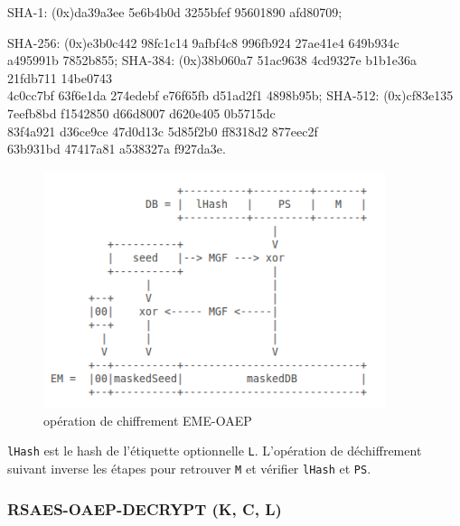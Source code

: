 \begin{description}
   	\item SHA-1:   (0x)da39a3ee 5e6b4b0d 3255bfef 95601890 afd80709;
   	\item SHA-256: (0x)e3b0c442 98fc1c14 9afbf4c8 996fb924 27ae41e4 649b934c\\
                a495991b 7852b855;
   	SHA-384: (0x)38b060a7 51ac9638 4cd9327e b1b1e36a 21fdb711 14be0743\\
                4c0cc7bf 63f6e1da 274edebf e76f65fb d51ad2f1 4898b95b;
   	SHA-512: (0x)cf83e135 7eefb8bd f1542850 d66d8007 d620e405 0b5715dc\\
                83f4a921 d36ce9ce 47d0d13c 5d85f2b0 ff8318d2 877eec2f\\
                63b931bd 47417a81 a538327a f927da3e.\\
\end{description}

\begin{figure}[H]
	\centering
	\includegraphics[width=10cm]{images/schema.png}
	\caption{opération de chiffrement EME-OAEP}
	\label{fig21}
\end{figure}

\texttt{lHash} est le hash de l'étiquette optionnelle \texttt{L}. L'opération de déchiffrement suivant inverse les étapes pour retrouver \texttt{M} et vérifier \texttt{lHash} et \texttt{PS}.


\subsubsection{RSAES-OAEP-DECRYPT (K, C, L)}

